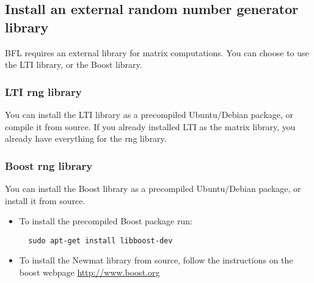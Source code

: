 \documentclass[a4paper,10pt]{article}
\begin{document}
\subsection{Install an external random number generator library}
BFL requires an external library for matrix computations. You can
choose to use the LTI library, or the Boost library.

\subsubsection{LTI rng library}
\label{subsec:lti}
You can install the LTI library as a precompiled Ubuntu/Debian
package, or compile it from source. If you already installed LTI as
the matrix library, you already have everything for the rng library.

\subsubsection{Boost rng library}
You can install the Boost library as a precompiled Ubuntu/Debian
package, or install it from source.
\begin{itemize}
\item To install the precompiled Boost package run:
\begin{verbatim}
  sudo apt-get install libboost-dev
\end{verbatim}
\item To install the Newmat library from source, follow the
  instructions on the boost webpage \url{http://www.boost.org}
\end{itemize}
\end{document}
